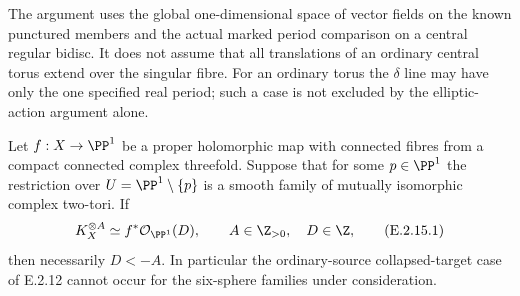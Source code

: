 \begin{remark}
The argument uses the global one-dimensional
space of vector fields on the known punctured
members and the actual marked period comparison
on a central regular bidisc.  It does not
assume that all translations of an ordinary
central torus extend over the singular fibre.
For an ordinary torus the $\delta$ line may
have only the one specified real period;
such a case is not excluded by the
elliptic-action argument alone.
\end{remark}

\begin{proposition}
Let $f:X\to\PP^1$ be a proper holomorphic map with connected
fibres from a compact connected complex threefold.  Suppose
that for some $p\in\PP^1$ the restriction over
$U=\PP^1\setminus\{p\}$ is a smooth family of mutually
isomorphic complex two-tori.  If
\[
 K_X^{\otimes A}\simeq f^*\mathcal O_{\PP^1}(D),
 \qquad A\in\Z_{>0},\quad D\in\Z,
 \tag{E.2.15.1}
\]
then necessarily $D<-A$.  In particular the ordinary-source
collapsed-target case of E.2.12 cannot occur for the
six-sphere families under consideration.
\end{proposition}
